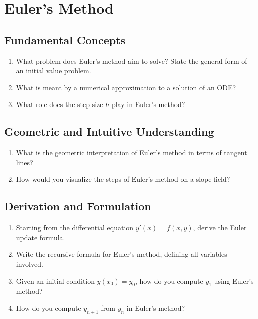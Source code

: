 \section{Euler's Method}

\subsection{Fundamental Concepts}
\begin{enumerate}
  \item What problem does Euler's method aim to solve? State the general form of an initial value problem.
  \item What is meant by a numerical approximation to a solution of an ODE?
  \item What role does the step size $h$ play in Euler's method?
\end{enumerate}

\subsection{Geometric and Intuitive Understanding}
\begin{enumerate}[resume]
  \item What is the geometric interpretation of Euler's method in terms of tangent lines?
  \item How would you visualize the steps of Euler's method on a slope field?
\end{enumerate}

\subsection{Derivation and Formulation}
\begin{enumerate}[resume]
  \item Starting from the differential equation $y'(x) = f(x,y)$, derive the Euler update formula.
  \item Write the recursive formula for Euler's method, defining all variables involved.
  \item Given an initial condition $y(x_0) = y_0$, how do you compute $y_1$ using Euler's method?
  \item How do you compute $y_{n+1}$ from $y_n$ in Euler's method?
\end{enumerate}

